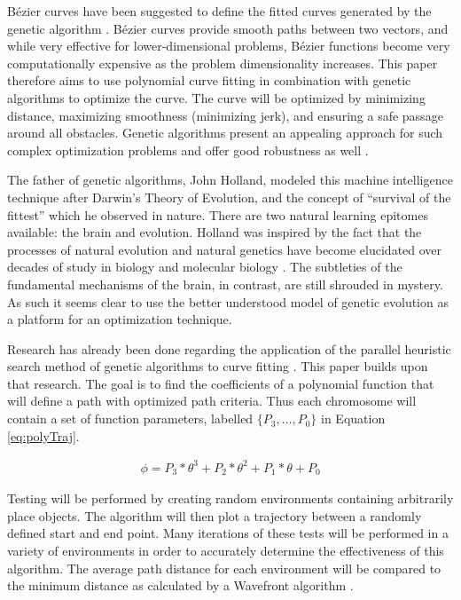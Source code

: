 B\'{e}zier curves have been suggested to define the fitted curves generated by the genetic algorithm \cite{choi10}. B\'{e}zier curves provide smooth paths between two vectors, and while very effective for lower-dimensional problems, B\'{e}zier functions become very computationally expensive as the problem dimensionality increases. This paper therefore aims to use polynomial curve fitting in combination with genetic algorithms to optimize the curve. The curve will be optimized by minimizing distance, maximizing smoothness (minimizing jerk), and ensuring a safe passage around all obstacles. Genetic algorithms present an appealing approach for such complex optimization problems and offer good robustness as well \cite{zou12}.

The father of genetic algorithms, John Holland, modeled this machine intelligence technique after Darwin's Theory of Evolution, and the concept of ``survival of the fittest'' which he observed in nature. There are two natural learning epitomes available: the brain and evolution. Holland was inspired by the fact that the processes of natural evolution and natural genetics have become elucidated over decades of study in biology and molecular biology \cite{goldberg88}. The subtleties of the fundamental mechanisms of the brain, in contrast, are still shrouded in mystery. As such it seems clear to use the better understood model of genetic evolution as a platform for an optimization technique.

Research has already been done regarding the application of the parallel heuristic search method of genetic algorithms to curve fitting \cite{gulsen95,karr91,ismail08}. This paper builds upon that research. The goal is to find the coefficients of a polynomial function that will define a path with optimized path criteria. Thus each chromosome will contain a set of function parameters, labelled $\{P_3, \ldots, P_0\}$ in Equation \ref{eq:polyTraj}.

\begin{align} \label{eq:polyTraj}
	\phi = P_3*\theta^3 + P_2*\theta^2 + P_1*\theta + P_0
\end{align}

Testing will be performed by creating random environments containing arbitrarily place objects. The algorithm will then plot a trajectory between a randomly defined start and end point. Many iterations of these tests will be performed in a variety of environments in order to accurately determine the effectiveness of this algorithm. The average path distance for each environment will be compared to the minimum distance as calculated by a Wavefront algorithm \cite{waslanderI}.

